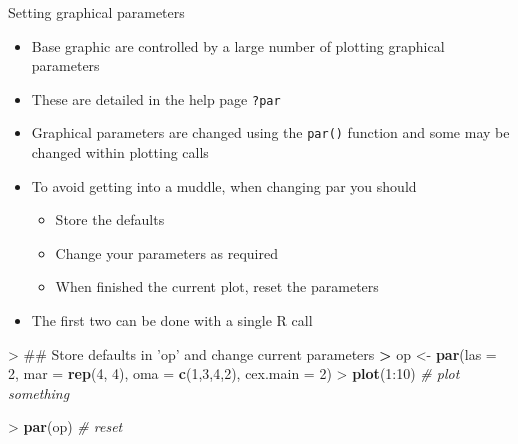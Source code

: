 \documentclass[10pt,ignorenonframetext,compress, aspectratio=169]{beamer}
\newenvironment{Shaded}{\begin{snugshade}}{\end{snugshade}}
\newcommand{\KeywordTok}[1]{\textcolor[rgb]{0.13,0.29,0.53}{\textbf{{#1}}}}
\newcommand{\DataTypeTok}[1]{\textcolor[rgb]{0.13,0.29,0.53}{{#1}}}
\newcommand{\DecValTok}[1]{\textcolor[rgb]{0.00,0.00,0.81}{{#1}}}
\newcommand{\StringTok}[1]{\textcolor[rgb]{0.31,0.60,0.02}{{#1}}}
\newcommand{\CommentTok}[1]{\textcolor[rgb]{0.56,0.35,0.01}{\textit{{#1}}}}
\newcommand{\ErrorTok}[1]{\textcolor[rgb]{0.64,0.00,0.00}{\textbf{{#1}}}}
\newcommand{\NormalTok}[1]{{#1}}
\providecommand{\tightlist}{%
  \setlength{\itemsep}{0pt}\setlength{\parskip}{0pt}}
\begin{document}
\begin{frame}[fragile]{Setting graphical parameters}

\begin{itemize}
\tightlist
\item
  Base graphic are controlled by a large number of plotting graphical
  parameters
\item
  These are detailed in the help page \texttt{?par}
\item
  Graphical parameters are changed using the \texttt{par()} function and
  some may be changed within plotting calls
\item
  To avoid getting into a muddle, when changing par you should

  \begin{itemize}
  \tightlist
  \item
    Store the defaults
  \item
    Change your parameters as required
  \item
    When finished the current plot, reset the parameters
  \end{itemize}
\item
  The first two can be done with a single R call
\end{itemize}

\begin{Shaded}
\begin{Highlighting}[]
\NormalTok{>}\StringTok{ }\NormalTok{## Store defaults in 'op' and change current parameters}
\ErrorTok{>}\StringTok{ }\NormalTok{op <-}\StringTok{ }\KeywordTok{par}\NormalTok{(}\DataTypeTok{las =} \DecValTok{2}\NormalTok{, }\DataTypeTok{mar =} \KeywordTok{rep}\NormalTok{(}\DecValTok{4}\NormalTok{, }\DecValTok{4}\NormalTok{), }\DataTypeTok{oma =} \KeywordTok{c}\NormalTok{(}\DecValTok{1}\NormalTok{,}\DecValTok{3}\NormalTok{,}\DecValTok{4}\NormalTok{,}\DecValTok{2}\NormalTok{), }\DataTypeTok{cex.main =} \DecValTok{2}\NormalTok{)}
\NormalTok{>}\StringTok{ }\KeywordTok{plot}\NormalTok{(}\DecValTok{1}\NormalTok{:}\DecValTok{10}\NormalTok{) }\CommentTok{# plot something}
\end{Highlighting}
\end{Shaded}

\begin{Shaded}
\begin{Highlighting}[]
\NormalTok{>}\StringTok{ }\KeywordTok{par}\NormalTok{(op)    }\CommentTok{# reset}
\end{Highlighting}
\end{Shaded}

\end{frame}
\end{document}
